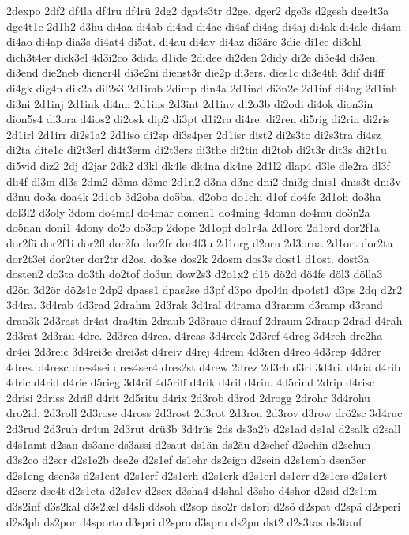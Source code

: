 {2dexpo
2df2
df4la
df4ru
df4rü
2dg2
dga4s3tr
d2ge.
dger2
dge3s
d2gesh
dge4t3a
dge4t1e
2d1h2
d3hu
di4aa
di4ab
di4ad
di4ae
di4af
di4ag
di4aj
di4ak
di4ale
di4am
di4ao
di4ap
dia3s
di4at4
di5at.
di4au
di4av
di4az
di3äre
3dic
di1ce
di3chl
dich3t4er
dick3el
4d3i2co
3dida
d1ide
2didee
di2den
2didy
di2e
di3e4d
di3en.
di3end
die2neb
diener4l
di3e2ni
dienst3r
die2p
di3ers.
dies1c
di3e4th
3dif
di4ff
di4gk
dig4n
dik2a
dil2s3
2d1imb
2dimp
din4a
2d1ind
di3n2e
2d1inf
di4ng
2d1inh
di3ni
2d1inj
2d1ink
di4nn
2d1ins
2d3int
2d1inv
di2o3b
di2odi
di4ok
dion3in
dion5s4
di3ora
d4ios2
di2osk
dip2
di3pt
d1i2ra
di4re.
di2ren
di5rig
di2rin
di2ris
2d1irl
2d1irr
di2s1a2
2d1iso
di2sp
di3s4per
2d1isr
dist2
di2s3to
di2s3tra
di4sz
di2ta
dite1c
di2t3erl
di4t3erm
di2t3ers
di3the
di2tin
di2tob
di2t3r
dit3s
di2t1u
di5vid
diz2
2dj
d2jar
2dk2
d3kl
dk4le
dk4na
dk4ne
2d1l2
dlap4
d3le
dle2ra
dl3f
dli4f
dl3m
dl3s
2dm2
d3ma
d3me
2d1n2
d3na
d3ne
dni2
dni3g
dnis1
dnis3t
dni3v
d3nu
do3a
doa4k
2d1ob
3d2oba
do5ba.
d2obo
do1chi
d1of
do4fe
2d1oh
do3ha
dol3l2
d3oly
3dom
do4mal
do4mar
domen1
do4ming
4domn
do4mu
do3n2a
do5nan
doni1
4dony
do2o
do3op
2dope
2d1opf
do1r4a
2d1orc
2d1ord
dor2f1a
dor2fä
dor2f1i
dor2fl
dor2fo
dor2fr
dor4f3u
2d1org
d2orn
2d3orna
2d1ort
dor2ta
dor2t3ei
dor2ter
dor2tr
d2os.
do3se
dos2k
2dosm
dos3s
dost1
d1ost.
dost3a
dosten2
do3ta
do3th
do2tof
do3un
dow2s3
d2o1x2
d1ö
dö2d
dö4fe
döl3
dölla3
d2ön
3d2ör
dö2s1c
2dp2
dpass1
dpas2se
d3pf
d3po
dpol4n
dpo4st1
d3ps
2dq
d2r2
3d4ra.
3d4rab
4d3rad
2drahm
2d3rak
3d4ral
d4rama
d3ramm
d3ramp
d3rand
dran3k
2d3rast
dr4at
dra4tin
2draub
2d3rauc
d4rauf
2draum
2draup
2dräd
d4räh
2d3rät
2d3räu
4dre.
2d3rea
d4rea.
d4reas
3d4reck
2d3ref
4dreg
3d4reh
dre2ha
dr4ei
2d3reic
3d4rei3e
drei3st
d4reiv
d4rej
4drem
4d3ren
d4reo
4d3rep
4d3rer
4dres.
d4resc
dres4sei
dres4ser4
dres2st
d4rew
2drez
2d3rh
d3ri
3d4ri.
d4ria
d4rib
4dric
d4rid
d4rie
d5rieg
3d4rif
4d5riff
d4rik
d4ril
d4rin.
4d5rind
2drip
d4risc
2drisi
2driss
2driß
d4rit
2d5ritu
d4rix
2d3rob
d3rod
2drogg
2drohr
3d4rohu
dro2id.
2d3roll
2d3rose
d4ross
2d3rost
2d3rot
2d3rou
2d3rov
d3row
drö2sc
3d4ruc
2d3rud
2d3ruh
dr4un
2d3rut
drü3b
3d4rüs
2ds
ds3a2b
d2s1ad
ds1al
d2salk
d2sall
d4s1amt
d2san
ds3ane
ds3assi
d2saut
ds1än
ds2äu
d2schef
d2schin
d2schun
d3s2co
d2scr
d2s1e2b
dse2e
d2s1ef
ds1ehr
ds2eign
d2sein
d2s1emb
dsen3er
d2s1eng
dsen3s
d2s1ent
d2s1erf
d2s1erh
d2s1erk
d2s1erl
ds1err
d2s1ers
d2s1ert
d2serz
dse4t
d2s1eta
d2s1ev
d2sex
d3sha4
d4shal
d3sho
d4shor
d2sid
d2s1im
d3s2inf
d3s2kal
d3s2kel
d4sli
d3soh
d2sop
dso2r
ds1ori
d2sö
d2spat
d2spä
d2speri
d2s3ph
ds2por
d4sporto
d3spri
d2spro
d3spru
ds2pu
dst2
d2s3tas
ds3tauf
}
